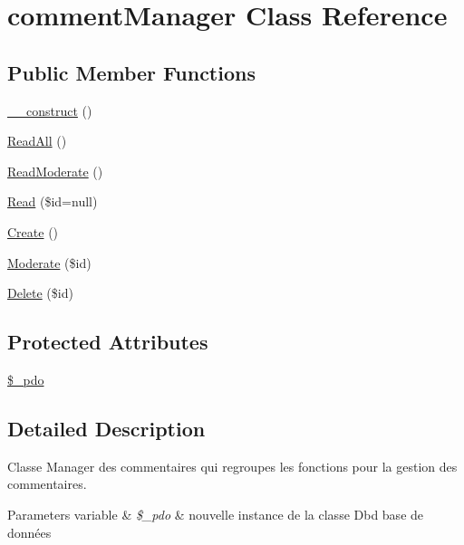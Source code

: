 \hypertarget{class_src_1_1_managers_1_1comment_manager}{}\section{comment\+Manager Class Reference}
\label{class_src_1_1_managers_1_1comment_manager}
\subsection*{Public Member Functions}
\begin{DoxyCompactItemize}
\item 
\hyperlink{class_src_1_1_managers_1_1comment_manager_a095c5d389db211932136b53f25f39685}{\+\_\+\+\_\+construct} ()
\item 
\hyperlink{class_src_1_1_managers_1_1comment_manager_a24f9f6fa83eb8694eab0a87b2e6ad0b1}{Read\+All} ()
\item 
\hyperlink{class_src_1_1_managers_1_1comment_manager_a4224d6d3de965c48624a2c530d0a2c94}{Read\+Moderate} ()
\item 
\hyperlink{class_src_1_1_managers_1_1comment_manager_af0b2d518844625de0b1fe21ebb8e6c58}{Read} (\$id=null)
\item 
\hyperlink{class_src_1_1_managers_1_1comment_manager_ad01f71fa0ecc039494e3c282864298c3}{Create} ()
\item 
\hyperlink{class_src_1_1_managers_1_1comment_manager_a511df177d885f133ac59c2b68c7046f2}{Moderate} (\$id)
\item 
\hyperlink{class_src_1_1_managers_1_1comment_manager_a59113b5ecd1d155db6a4f30af34a1e80}{Delete} (\$id)
\end{DoxyCompactItemize}
\subsection*{Protected Attributes}
\begin{DoxyCompactItemize}
\item 
\hyperlink{class_src_1_1_managers_1_1comment_manager_a1e6d977917b70dce7e26cebad8438bf4}{\$\+\_\+pdo}
\end{DoxyCompactItemize}


\subsection{Detailed Description}
Classe Manager des commentaires qui regroupes les fonctions pour la gestion des commentaires. 
\begin{DoxyParams}[1]{Parameters}
variable & {\em \$\+\_\+pdo} & nouvelle instance de la classe Dbd base de données \\
\hline
\end{DoxyParams}



